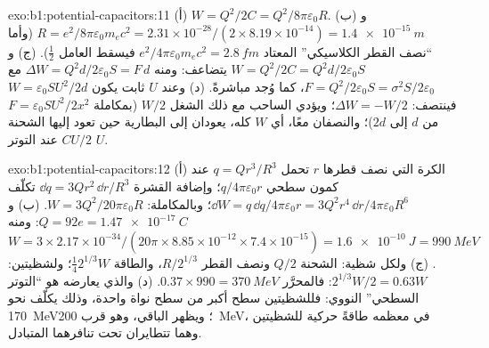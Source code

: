 \begin{solution}{exo:b1:potential-capacitors:11}
(أ) $W = Q^2/2C = Q^2/8\pi\varepsilon_0R$. (ب) و $R = e^2/8\pi\varepsilon_0m_ec^2 = 2.31 \times
10^{-28}/(2 \times 8.19 \times 10^{-14}) = \qty{1.4e-15}{m}$ (وأما ``نصف القطر
الكلاسيكي'' المعتاد $e^2/4\pi\varepsilon_0m_ec^2 = \qty{2.8}{fm}$ فيسقط العامل $\tfrac12$). (ج) و $W =
Q^2/2C = Q^2d/2\varepsilon_0S$ يتضاعف: ومنه $\Delta W = Q^2d/2\varepsilon_0S = F\,d$ مع $F =
Q^2/2\varepsilon_0S = \sigma^2S/2\varepsilon_0$، كما وُجد مباشرةً. (د) وعند $U$ ثابت يكون $W =
\varepsilon_0SU^2/2d$ فينتصف: $\Delta W = -W/2$؛ ويؤدي الساحب مع ذلك الشغل $W/2$
(بمكاملة $F = \varepsilon_0SU^2/2x^2$ من $d$ إلى $2d$)؛ والنصفان معًا، أي $W$
كله، يعودان إلى البطارية حين تعود إليها الشحنة $CU/2$ عند
التوتر $U$.
\end{solution}

\begin{solution}{exo:b1:potential-capacitors:12}
(أ) الكرة التي نصف قطرها $r$ تحمل $q = Qr^3/R^3$ عند كمون سطحي
$q/4\pi\varepsilon_0r$؛ وإضافة القشرة $\dd q = 3Qr^2\,\dd r/R^3$ تكلّف $\dd W =
q\,\dd q/4\pi\varepsilon_0r = 3Q^2r^4\,\dd r/4\pi\varepsilon_0R^6$؛ وبالمكاملة: $W =
3Q^2/20\pi\varepsilon_0R$. (ب) و $Q = 92e = \qty{1.47e-17}{C}$: ومنه $W = 3 \times 2.17 \times
10^{-34}/(20\pi \times 8.85 \times 10^{-12} \times 7.4 \times 10^{-15}) = \qty{1.6e-10}{J}
= \qty{990}{MeV}$. (ج) ولكل شظية: الشحنة $Q/2$ ونصف القطر $R/2^{1/3}$،
والطاقة $\tfrac14 2^{1/3}W$؛ ولشظيتين: $2^{1/3}W/2 = 0.63W$: فالمحرَّر
$0.37 \times 990 = \qty{370}{MeV}$. (د) والذي يعارضه هو ``التوتر السطحي'' النووي:
فللشظيتين سطح أكبر من سطح نواة واحدة، وذلك يكلّف نحو
\qty{170}{MeV}؛ ويظهر الباقي، وهو قرب \qty{200}{MeV}، في معظمه
طاقةً حركية للشظيتين وهما تتطايران تحت تنافرهما
المتبادل.
\end{solution}

